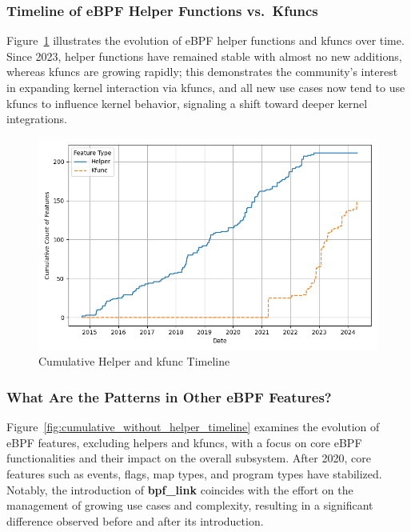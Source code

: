 \subsubsection{Timeline of eBPF Helper Functions vs.\ Kfuncs}

Figure~\ref{fig:cumulative_helper_kfunc_timeline} illustrates the evolution of eBPF helper functions and kfuncs over time. Since 2023, helper functions have remained stable with almost no new additions, whereas kfuncs are growing rapidly; this demonstrates the community's interest in expanding kernel interaction via kfuncs, and all new use cases now tend to use kfuncs to influence kernel behavior, signaling a shift toward deeper kernel integrations.

\begin{figure}[ht]
    \centering
    \includegraphics[width=\linewidth]{feature-analysis/cumulative_helper_kfunc_timeline.png}
    \caption{Cumulative Helper and kfunc Timeline}
    \label{fig:cumulative_helper_kfunc_timeline}
\end{figure}

\subsubsection{What Are the Patterns in Other eBPF Features?}

Figure~\ref{fig:cumulative_without_helper_timeline} examines the evolution of eBPF features, excluding helpers and kfuncs, with a focus on core eBPF functionalities and their impact on the overall subsystem. After 2020, core features such as events, flags, map types, and program types have stabilized. Notably, the introduction of \textbf{bpf\_link} coincides with the effort on the management of growing use cases and complexity, resulting in a significant difference observed before and after its introduction.


